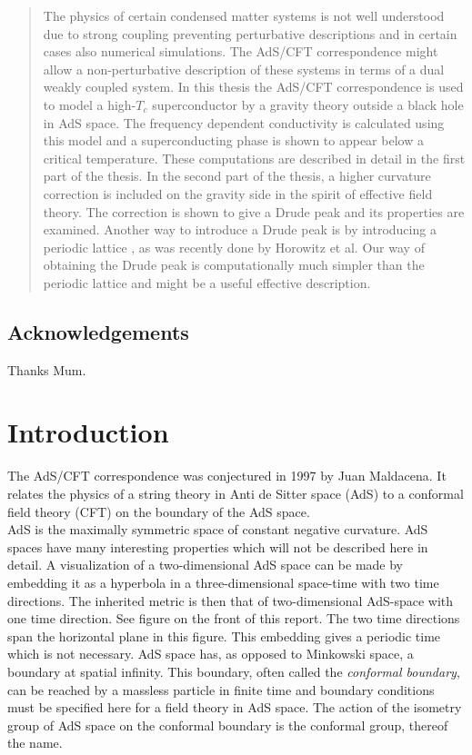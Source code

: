\documentclass[12pt]{report}
\begin{document}
\begin{abstract}
The physics of certain condensed matter systems is not well understood due to strong coupling preventing perturbative descriptions and in certain cases also numerical simulations.
The AdS/CFT correspondence might allow a non-perturbative description of these systems in terms of a dual weakly coupled system. In this thesis the AdS/CFT correspondence is used to model a high-$T_c$ superconductor by a gravity theory outside a black hole in AdS space. The frequency dependent conductivity is calculated using this model and a superconducting phase is shown to appear below a critical temperature.
These computations are described in detail in the first part of the thesis. 
In the second part of the thesis, a higher curvature correction is included on the gravity side in the spirit of effective field theory.
The correction is shown to give a Drude peak and its properties are examined.
Another way to introduce a Drude peak is by introducing a periodic lattice \cite{horowitz}, as was recently done by Horowitz et al. Our way of obtaining the Drude peak is computationally much simpler than the periodic lattice and might be a useful effective description.
\end{abstract}

\section*{Acknowledgements}
Thanks Mum.
\tableofcontents
\chapter{Introduction}
The AdS/CFT correspondence was conjectured in 1997 by Juan Maldacena. It relates the physics of a string theory in Anti de Sitter space (AdS) to a conformal field theory (CFT) on the boundary of the AdS space.\\

AdS is the maximally symmetric space of constant negative curvature. AdS spaces have many interesting properties which will not be described here in detail. A visualization of a two-dimensional AdS space can be made by embedding it as a hyperbola in a three-dimensional space-time with two time directions. The inherited metric is then that of two-dimensional AdS-space with one time direction. See figure on the front of this report. The two time directions span the horizontal plane in this figure. This embedding gives a periodic time which is not necessary. AdS space has, as opposed to Minkowski space, a boundary at spatial infinity. This boundary, often called the \emph{conformal boundary}, can be reached by a massless particle in finite time and boundary conditions must be specified here for a field theory in AdS space. The action of the isometry group of AdS space on the conformal boundary is the conformal group, thereof the name.\\
\end{document}

